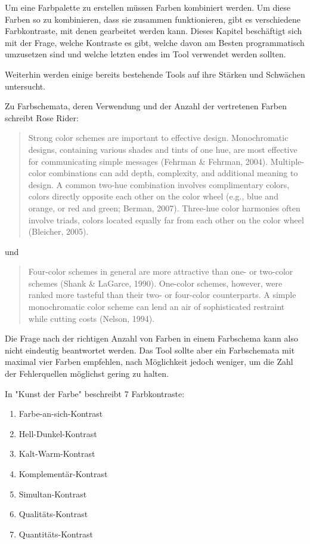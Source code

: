Um eine Farbpalette zu erstellen müssen Farben kombiniert werden. Um diese Farben so zu kombinieren, dass sie zusammen funktionieren, gibt es verschiedene Farbkontraste, mit denen gearbeitet werden kann.
Dieses Kapitel beschäftigt sich mit der Frage, welche Kontraste es gibt, welche davon am Besten programmatisch umzusetzen sind und welche letzten endes im Tool verwendet werden sollten.

Weiterhin werden einige bereits bestehende Tools auf ihre Stärken und Schwächen untersucht.

Zu Farbschemata, deren Verwendung und der Anzahl der vertretenen Farben schreibt Rose Rider:

\begin{quote}Strong color schemes are important to effective design. Monochromatic designs, containing various shades and tints of one hue, are most effective for communicating simple messages (Fehrman \& Fehrman, 2004). Multiple-color combinations can add depth, complexity, and additional meaning to design. A common two-hue combination involves complimentary colors, colors directly opposite each other on the color wheel (e.g., blue and orange, or red and green; Berman, 2007). Three-hue color harmonies often involve triads, colors located equally far from each other on the color wheel (Bleicher, 2005).
\end{quote}

und

\begin{quote}
Four-color schemes in general are more attractive than one- or two-color schemes (Shank \& LaGarce, 1990). One-color schemes, however, were ranked more tasteful than their two- or four-color counterparts. A simple monochromatic color scheme can lend an air of sophisticated restraint while cutting costs (Nelson, 1994).
\end{quote}

Die Frage nach der richtigen Anzahl von Farben in einem Farbschema kann also nicht eindeutig beantwortet werden. Das Tool sollte aber ein Farbschemata mit maximal vier Farben empfehlen, nach Möglichkeit jedoch weniger, um die Zahl der Fehlerquellen möglichst gering zu halten.

In "Kunst der Farbe" beschreibt \cite{Itten201006} 7 Farbkontraste:

\begin{enumerate}
  \item Farbe-an-sich-Kontrast
  \item Hell-Dunkel-Kontrast
  \item Kalt-Warm-Kontrast
  \item Komplementär-Kontrast
  \item Simultan-Kontrast
  \item Qualitäts-Kontrast
  \item Quantitäts-Kontrast
\end{enumerate}

